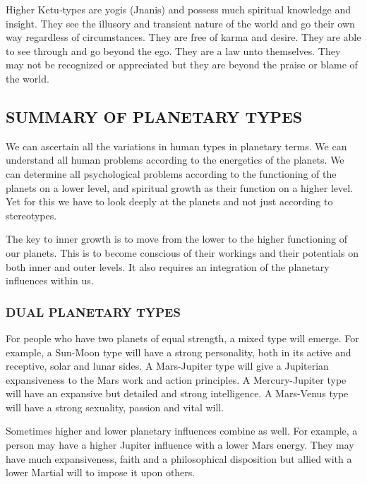  

Higher Ketu‑types are yogis (Jnanis) and possess much spiritual knowledge and insight. They see the illusory and transient nature of the world and go their own way regardless of circumstances. They are free of karma and desire. They are able to see through and go beyond the ego. They are a law unto themselves. They may not be recognized or appreciated but they are beyond the praise or blame of the world.

 

 

\subsection{SUMMARY OF PLANETARY TYPES}
 

We can ascertain all the variations in human types in planetary terms. We can understand all human problems according to the energetics of the planets. We can determine all psychological problems according to the functioning of the planets on a lower level, and spiritual growth as their function on a higher level. Yet for this we have to look deeply at the planets and not just according to stereotypes.

 

The key to inner growth is to move from the lower to the higher functioning of our planets. This is to become conscious of their workings and their potentials on both inner and outer levels. It also requires an integration of the planetary influences within us.

 

\subsubsection{DUAL PLANETARY TYPES}

 

For people who have two planets of equal strength, a mixed type will emerge. For example, a Sun-Moon type will have a strong personality, both in its active and receptive, solar and lunar sides. A Mars-Jupiter type will give a Jupiterian expansiveness to the Mars work and action principles. A Mercury-Jupiter type will have an expansive but detailed and strong intelligence. A Mars-Venus type will have a strong sexuality, passion and vital will.

 

Sometimes higher and lower planetary influences combine as well. For example, a person may have a higher Jupiter influence with a lower Mars energy. They may have much expansiveness, faith and a philosophical disposition but allied with a lower Martial will to impose it upon others.

